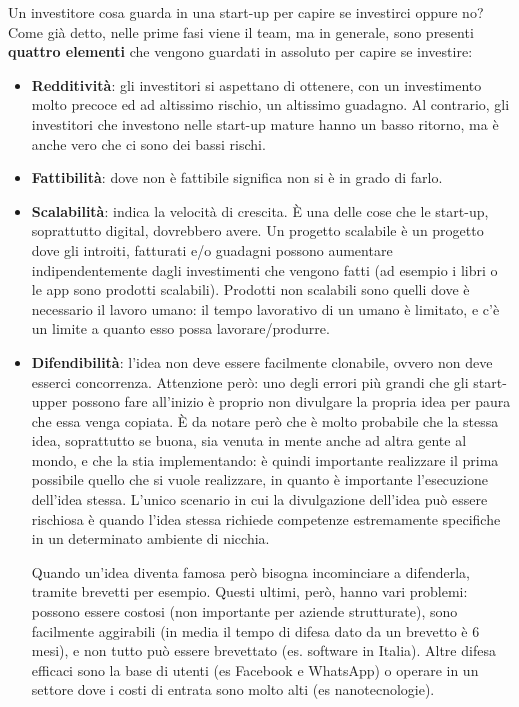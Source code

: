 Un investitore cosa guarda in una start-up per capire se investirci oppure no?
Come già detto, nelle prime fasi viene il team, ma in generale, sono presenti
\textbf{quattro elementi} che vengono guardati in assoluto per capire se
investire:
\begin{itemize}
 \item \textbf{Redditività}: gli investitori si aspettano di ottenere, con un
 investimento molto precoce ed ad altissimo rischio, un altissimo guadagno. Al
 contrario, gli investitori che investono nelle start-up mature hanno un basso
 ritorno, ma è anche vero che ci sono dei bassi rischi.
 \item \textbf{Fattibilità}: dove non è fattibile significa non si è in grado
 di farlo.
 \item \textbf{Scalabilità}: indica la velocità di crescita. È una delle cose
 che le start-up, soprattutto digital, dovrebbero avere. Un progetto scalabile
 è un progetto dove gli introiti, fatturati e/o guadagni possono aumentare
 indipendentemente dagli investimenti che vengono fatti (ad esempio i libri o
 le app sono prodotti scalabili). Prodotti non scalabili sono quelli dove è
 necessario il lavoro umano: il tempo lavorativo di un umano è limitato, e c'è
 un limite a quanto esso possa lavorare/produrre.
 \item \textbf{Difendibilità}: l'idea non deve essere facilmente clonabile,
 ovvero non deve esserci concorrenza. Attenzione però: uno degli errori più
 grandi che gli start-upper possono fare all'inizio è proprio non divulgare la
 propria idea per paura che essa venga copiata. È da notare però che è molto
 probabile che la stessa idea, soprattutto se buona, sia venuta in mente anche
 ad altra gente al mondo, e che la stia implementando: è quindi importante
 realizzare il prima possibile quello che si vuole realizzare, in quanto è
 importante l'esecuzione dell'idea stessa. L'unico scenario in cui la
 divulgazione dell'idea può essere rischiosa è quando l'idea stessa richiede
 competenze estremamente specifiche in un determinato ambiente di nicchia.

Quando un'idea diventa famosa però bisogna incominciare a
difenderla, tramite brevetti per esempio. Questi ultimi, però, hanno vari 
problemi: possono essere costosi (non importante per aziende strutturate),
sono facilmente aggirabili (in media il tempo di difesa dato da un brevetto
è 6 mesi), e non tutto può essere brevettato (es. software in Italia). Altre
difesa efficaci sono la base di utenti (es Facebook e WhatsApp) o operare in
un settore dove i costi di entrata sono molto alti (es nanotecnologie).
\end{itemize}

